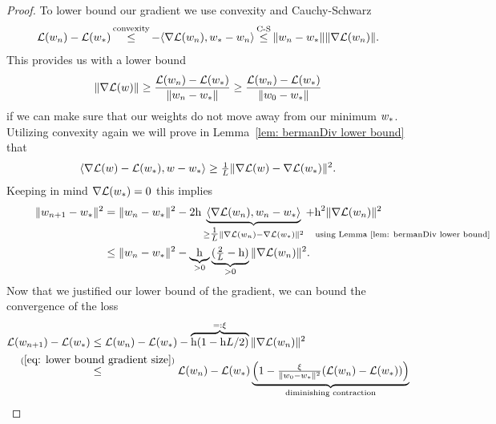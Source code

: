 \begin{proof}
	To lower bound our gradient we use convexity and Cauchy-Schwarz
	\begin{align*}
		\Loss(\weights_n)-\Loss(\minimum)
		\xle{\text{convexity}} -\langle \nabla\Loss(\weights_n), \minimum-\weights_n\rangle
		\xle{\text{C-S}} \|\weights_n - \minimum\| \|\nabla\Loss(\weights_n)\|.
	\end{align*}
	This provides us with a lower bound 
	\begin{align}\label{eq: lower bound gradient size}
		\|\nabla\mathcal{L}(w)\|
		\ge \frac{\mathcal{L}(w_n)-\mathcal{L}(w_*)}{\|w_n-w_*\|}
		\ge \frac{\mathcal{L}(w_n)-\mathcal{L}(w_*)}{\|w_0-w_*\|}
	\end{align}
	if we can make sure that our weights do not move away from our minimum \(w_*\).
	Utilizing convexity again we will prove in Lemma~\ref{lem: bermanDiv lower
	bound} that
	\begin{align*}
		\langle\nabla\mathcal{L}(w) - \mathcal{L}(w_*), w-w_*\rangle
		\ge \tfrac1{L} \|\nabla\mathcal{L}(w) - \nabla\mathcal{L}(w_*)\|^2.
	\end{align*}
	Keeping in mind \(\nabla \mathcal{L}(w_*)=0\) this implies
	\begin{align}
		\nonumber
		\|\weights_{n+1} - \minimum\|^2
		&= \|\weights_n - \minimum\|^2
		- 2\lr\underbrace{
			\langle \nabla\Loss(\weights_n), \weights_n - \minimum\rangle
		}_{
			\ge \tfrac{1}\ubound \|\nabla \Loss (\weights_n) - \nabla\Loss(\minimum)\|^2
			\mathrlap{\quad \text{using Lemma~\ref{lem: bermanDiv lower bound}}}
		} + \lr^2\|\nabla \Loss(\weights_n)\|^2
		\\
		&\le \|\weights_n - \minimum\|^2 - 
		\underbrace{\lr}_{>0}\underbrace{(\tfrac{2}{\ubound}-\lr)}_{>0}
		\|\nabla\Loss(\weights_n)\|^2.
		\label{eq: decreasing weight difference}
	\end{align}
	Now that we justified our lower bound of the gradient, we can bound the
	convergence of the loss
	\begin{align*}
		\Loss(\weights_{n+1}) - \Loss(\minimum)
		&\le \Loss(\weights_n)-\Loss(\minimum)
		- \overbrace{\lr(1-\lr\ubound/2)}^{=:\xi} \|\nabla \Loss(\weights_n)\|^2\\
		&\lxle{(\ref{eq: lower bound gradient size})}
		\Loss(\weights_n)-\Loss(\minimum)
		\underbrace{
			\left(1 - \tfrac{\xi}{\|\weights_0-\minimum\|^2}(\Loss(\weights_n)-\Loss(\minimum))\right)
		}_{\text{diminishing contraction}}
	\end{align*}

\end{proof}
